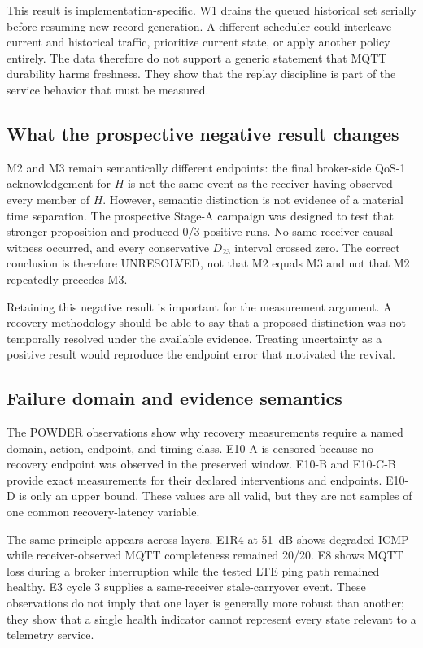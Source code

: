 \documentclass[journal]{IEEEtran}
\begin{document}
This result is implementation-specific. W1 drains the queued historical set serially before resuming new record generation. A different scheduler could interleave current and historical traffic, prioritize current state, or apply another policy entirely. The data therefore do not support a generic statement that MQTT durability harms freshness. They show that the replay discipline is part of the service behavior that must be measured.

\subsection{What the prospective negative result changes}

M2 and M3 remain semantically different endpoints: the final broker-side QoS-1 acknowledgement for $H$ is not the same event as the receiver having observed every member of $H$. However, semantic distinction is not evidence of a material time separation. The prospective Stage-A campaign was designed to test that stronger proposition and produced 0/3 positive runs. No same-receiver causal witness occurred, and every conservative $D_{23}$ interval crossed zero. The correct conclusion is therefore UNRESOLVED, not that M2 equals M3 and not that M2 repeatedly precedes M3.

Retaining this negative result is important for the measurement argument. A recovery methodology should be able to say that a proposed distinction was not temporally resolved under the available evidence. Treating uncertainty as a positive result would reproduce the endpoint error that motivated the revival.

\subsection{Failure domain and evidence semantics}

The POWDER observations show why recovery measurements require a named domain, action, endpoint, and timing class. E10-A is censored because no recovery endpoint was observed in the preserved window. E10-B and E10-C-B provide exact measurements for their declared interventions and endpoints. E10-D is only an upper bound. These values are all valid, but they are not samples of one common recovery-latency variable.

The same principle appears across layers. E1R4 at 51~dB shows degraded ICMP while receiver-observed MQTT completeness remained 20/20. E8 shows MQTT loss during a broker interruption while the tested LTE ping path remained healthy. E3 cycle 3 supplies a same-receiver stale-carryover event. These observations do not imply that one layer is generally more robust than another; they show that a single health indicator cannot represent every state relevant to a telemetry service.
\end{document}
